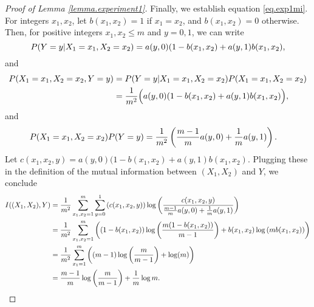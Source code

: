 \begin{proof}[Proof of Lemma \ref{lemma.experiment1}]
	Finally, we establish equation \eqref{eq.exp1mi}.
	For integers $x_1, x_2$, 
	let 
	$b(x_1, x_2) = 1$ if $x_1 = x_2$,
	and $b(x_1, x_2) = 0$ otherwise.
	Then, 
	for positive integers $x_1, x_2 \leq m$ and $y=0, 1$,
	we can write
	\begin{equation*}
		\Prob(Y=y \vert X_1 = x_1, X_2 = x_2)
		=
		a(y, 0)( 1 - b(x_1, x_2)
		+
		a(y, 1) b(x_1, x_2),
	\end{equation*}
	and
	\begin{equation*}
		\begin{split}
		\Prob(X_1 = x_1, X_2 = x_2, Y = y)
			&=
		\Prob(Y=y \vert X_1 = x_1, X_2 = x_2)
		\Prob(X_1 = x_1, X_2 = x_2)
		\\
			&=
		\frac{1}{m\squared}
		\Big(
		a(y, 0)( 1 - b(x_1, x_2)
		+
		a(y, 1) b(x_1, x_2)
		\Big),
		\end{split}
	\end{equation*}
	and
	\begin{equation*}
		\begin{split}
			\Prob(X_1 = x_1, X_2 = x_2) \Prob(Y = y)
			&=
			\frac{1}{m\squared}
			\left(
			\frac{m-1}{m} a(y, 0)
			+
			\frac{1}{m} a(y, 1)
			\right).
		\end{split}
	\end{equation*}
	Let 
	$c(x_1, x_2, y) = 
			a(y, 0)( 1 - b(x_1, x_2)
			+
			a(y, 1) b(x_1, x_2)
			$.
	Plugging these in the definition of the mutual information between $(X_1, X_2)$ and $Y$,
	we conclude
	\begin{equation*}
		\begin{split}
			I((X_1, X_2), Y)
			& =
			\frac{1}{m\squared}
			\sum_{x_1, x_2 = 1}^{m}
			\sum_{y=0}^{1}
			\left(
			c(x_1, x_2, y)
			\right)
			\log
			\left(
			\frac
			{
			c(x_1, x_2, y)
			}
			{
				\frac{m-1}{m} a(y, 0) + \frac{1}{m} a(y, 1)
			}
			\right)
			\\
			& = 
			\frac{1}{m\squared}
			\sum_{x_1, x_2 = 1}^{m}
			\left(
			(1 - b(x_1, x_2))
			\log
			\left(
			\frac{m(1-b(x_1, x_2))}{m-1}
			\right)
			+
			b(x_1, x_2)
			\log
			\left(
			m b(x_1, x_2)
			\right)
			\right)
			\\
			& =
			\frac{1}{m\squared}
			\sum_{x_1 = 1}^{m}
			\left(
			(m-1)\log\left(\frac{m}{m-1}\right) + \log(m)
			\right)
			\\
			& =
			\frac{m-1}{m} \log\left(\frac{m}{m-1}\right)
			+
			\frac{1}{m}\log m
			.
		\end{split}
	\end{equation*}

\end{proof}
